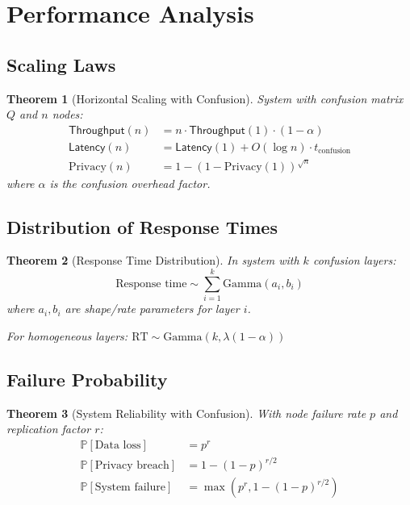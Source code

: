 \documentclass[11pt,final]{article}
\newcommand{\Throughput}{\mathsf{Throughput}}
\newcommand{\Latency}{\mathsf{Latency}}
\newtheorem{theorem}{Theorem}[section]
\begin{document}
\section{Performance Analysis}

\subsection{Scaling Laws}

\begin{theorem}[Horizontal Scaling with Confusion]
System with confusion matrix $Q$ and $n$ nodes:
\begin{align}
\Throughput(n) &= n \cdot \Throughput(1) \cdot (1-\alpha) \\
\Latency(n) &= \Latency(1) + O(\log n) \cdot t_{\text{confusion}} \\
\text{Privacy}(n) &= 1 - (1 - \text{Privacy}(1))^{\sqrt{n}}
\end{align}
where $\alpha$ is the confusion overhead factor.
\end{theorem}

\subsection{Distribution of Response Times}

\begin{theorem}[Response Time Distribution]
In system with $k$ confusion layers:
\begin{equation}
\text{Response time} \sim \sum_{i=1}^k \text{Gamma}(a_i, b_i)
\end{equation}
where $a_i, b_i$ are shape/rate parameters for layer $i$.

For homogeneous layers: $\text{RT} \sim \text{Gamma}(k, \lambda(1-\alpha))$
\end{theorem}

\subsection{Failure Probability}

\begin{theorem}[System Reliability with Confusion]
With node failure rate $p$ and replication factor $r$:
\begin{align}
\mathbb{P}[\text{Data loss}] &= p^r \\
\mathbb{P}[\text{Privacy breach}] &= 1-(1-p)^{r/2} \\
\mathbb{P}[\text{System failure}] &= \max(p^r, 1-(1-p)^{r/2})
\end{align}
\end{theorem}
\end{document}
